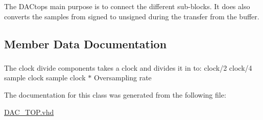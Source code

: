 The D\-A\-Ctops main purpose is to connect the different sub-\/blocks. It does also converts the samples from signed to unsigned during the transfer from the buffer. 

\subsection{Member Data Documentation}
\hypertarget{classdac__Top_1_1TOP__DAC_a904d954c80fa4089ba9eeeb9497214f2}{
\subsubsection[{clk\-\_\-divide}]{ {\bfseries \textcolor{vhdlchar}{ }} \hspace{0.3cm}{\ttfamily [Component]}}}\label{classdac__Top_1_1TOP__DAC_a904d954c80fa4089ba9eeeb9497214f2}
The clock divide components takes a clock and divides it in to\-: clock/2 clock/4 sample clock sample clock $\ast$ Oversampling rate 

The documentation for this class was generated from the following file\-:\begin{DoxyCompactItemize}
\item 
\hyperlink{DAC__TOP_8vhd}{D\-A\-C\-\_\-\-T\-O\-P.\-vhd}\end{DoxyCompactItemize}
